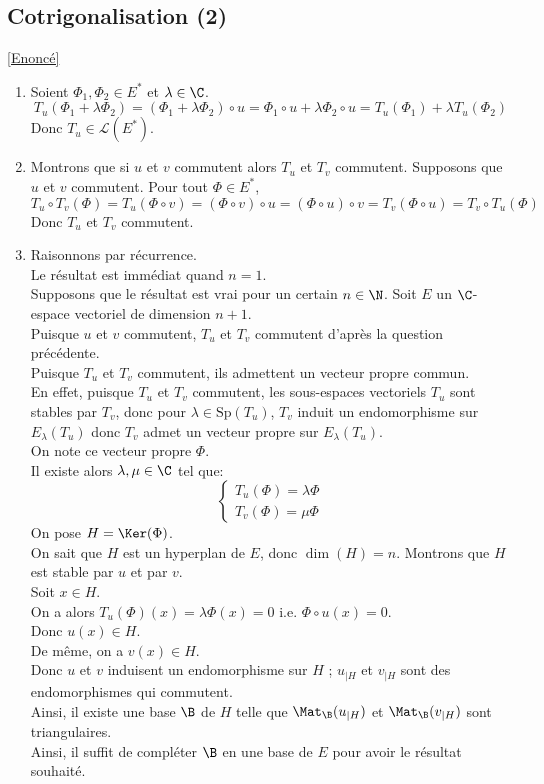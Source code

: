 \documentclass[8pt]{book}
\begin{document}
	\subsection{Cotrigonalisation (2) }
	\label{Cotrigonalisation (2) corrigé}
	\textcolor{blue}{\hyperref[Cotrigonalisation (2)]{[Enoncé]}}\\
	\begin{enumerate}[leftmargin=*]
		\item Soient $\Phi_1,\Phi_2\in E^*$ et $\lambda\in \C$.\\
		\[T_u(\Phi_1+\lambda\Phi_2)=(\Phi_1+\lambda\Phi_2)\circ u=\Phi_1\circ u +\lambda\Phi_2\circ u=T_u(\Phi_1)+\lambda T_u(\Phi_2)\]
		Donc $T_u\in\mathcal{L}(E^*)$.
		\item Montrons que si $u$ et $v$ commutent alors $T_u$ et $T_v$ commutent.
		Supposons que $u$ et $v$ commutent.
		Pour tout $\Phi\in E^*$, \[T_u\circ T_v(\Phi)=T_u(\Phi\circ v)=(\Phi\circ v)\circ u=(\Phi\circ u)\circ v=T_v(\Phi\circ u)=T_v\circ T_u(\Phi)\]
		Donc $T_u$ et $T_v$ commutent.
		\item Raisonnons par récurrence. \\
		Le résultat est immédiat quand $n=1$.\\
		Supposons que le résultat est vrai pour un certain $n\in \N$.
		Soit $E$ un $\C$-espace vectoriel de dimension $n+1$.\\
		Puisque $u$ et $v$ commutent, $T_u$ et $T_v$ commutent d'après la question précédente.\\
		Puisque $T_u$ et $T_v$ commutent, ils admettent un vecteur propre commun.\\
		En effet, puisque $T_u$ et $T_v$ commutent, les sous-espaces vectoriels $T_u$ sont stables par $T_v$, donc pour $\lambda\in \text{Sp}(T_u)$, $T_v$ induit un endomorphisme sur $E_\lambda(T_u)$ donc $T_v$ admet un vecteur propre sur $E_\lambda(T_u)$.\\
		On note ce vecteur propre $\Phi$.\\
		Il existe alors $\lambda,\mu\in \C$ tel que: \[\begin{cases}
			T_u(\Phi)=\lambda\Phi\\
			T_v(\Phi)=\mu\Phi
		\end{cases}\]
		On pose $H=\Ker(\Phi)$.\\
		On sait que $H$ est un hyperplan de $E$, donc $\dim(H)=n$.
		Montrons que $H$ est stable par $u$ et par $v$.\\
		Soit $x\in H$.\\
		On a alors $T_u(\Phi)(x)=\lambda\Phi(x)=0$ i.e. $\Phi\circ u(x)=0$.\\
		Donc $u(x)\in H$.\\
		De même, on a $v(x)\in H$.\\
		Donc $u$ et $v$ induisent un endomorphisme sur $H$ ; $u_{|H}$ et $v_{|H}$ sont des endomorphismes qui commutent.\\
		Ainsi, il existe une base $\B$ de $H$ telle que $\Mat_\B(u_{|H})$ et $\Mat_\B(v_{|H})$ sont triangulaires.\\
		Ainsi, il suffit de compléter $\B$ en une base de $E$ pour avoir le résultat souhaité.
	\end{enumerate}
	
\end{document}
